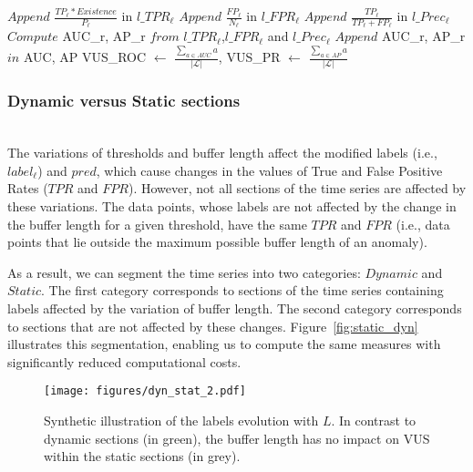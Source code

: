 \begin{algorithm}
{{{{            }
            $Append$ $\frac{TP_\ell*Existence}{P_\ell}$ in $l\_TPR_{\ell}$\;
            $Append$ $\frac{FP_\ell}{N_\ell}$ in $l\_FPR_{\ell}$\;
            $Append$ $\frac{TP_\ell}{TP_\ell+FP_\ell}$ in $l\_Prec_{\ell}$\;   
        }
        $Compute$ AUC\_r, AP\_r $from$ $l\_TPR_{\ell}$,$l\_FPR_{\ell}$ and $l\_Prec_{\ell}$\;
        $Append$ AUC\_r, AP\_r $in$ AUC, AP\;
    }
    VUS\_ROC $\leftarrow$ $\frac{\sum_{a\in AUC}a}{|\mathcal{L}|}$,
    VUS\_PR $\leftarrow$ $\frac{\sum_{a\in AP}a}{|\mathcal{L}|}$\;
 }
\end{algorithm}










\subsubsection{Dynamic versus Static sections}\hfill\\

The variations of thresholds and buffer length affect the modified labels (i.e., $label_\ell$) and $pred$, which cause changes in the values of True and False Positive Rates ($TPR$ and $FPR$). 
However, not all sections of the time series are affected by these variations. 
The data points, whose labels are not affected by the change in the buffer length for a given threshold, have the same $TPR$ and $FPR$ (i.e., data points that lie outside the maximum possible buffer length of an anomaly). 

As a result, we can segment the time series into two categories: $Dynamic$ and $Static$. The first category corresponds to sections of the time series containing labels affected by the variation of buffer length. The second category corresponds to sections that are not affected by these changes. Figure~\ref{fig:static_dyn} illustrates this segmentation, enabling us to compute the same measures with significantly reduced computational costs.





\begin{figure}[tb]
  \centering
  \texttt{[image: figures/dyn\_stat\_2.pdf]}
  \caption{Synthetic illustration of the labels evolution with $L$. In contrast to dynamic sections (in green), the buffer length has no impact on VUS within the static sections (in grey).}
  \label{fig:static_dyn_2}
\end{figure}





